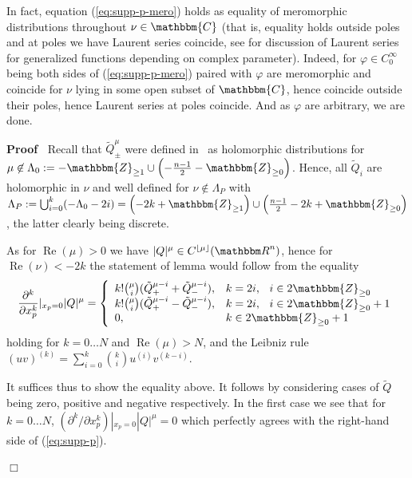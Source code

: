 \documentclass{article}
\newcommand{\assign}{:=}
\newcommand{\nin}{\not\in}
\newcommand{\tmop}[1]{\ensuremath{\operatorname{#1}}}
\newenvironment{proof}{\noindent\textbf{Proof\ }}{\hspace*{\fill}$\Box$\medskip}
\numberwithin{definition}{section}
\numberwithin{lemma}{section}
\numberwithin{proposition}{section}
{\theorembodyfont{\rmfamily}\newtheorem{remark}{Remark}
\numberwithin{remark}{section}
}
\newcommand{\C}{{\mathbbm{C}}}\newcommand{\Z}{{\mathbbm{Z}}}
\newcommand{\mybra}[1]{(#1)} \newcommand{\mysbra}[1]{\left[#1\right]}
\begin{document}
\begin{remark}
  In fact, equation (\ref{eq:supp-p-mero}) holds as equality of meromorphic
  distributions throughout $\nu \in \C$ (that is, equality holds outside poles
  and at poles we have Laurent series coincide, see {\cite[ch. I,
  A.2.3]{gelfand1980distribution}} for discussion of Laurent series for
  generalized functions depending on complex parameter). Indeed, for $\varphi
  \in C^{\infty}_0$ being both sides of (\ref{eq:supp-p-mero}) paired with
  $\varphi$ are meromorphic and coincide for $\nu$ lying in some open subset
  of $\C$, hence coincide outside their poles, hence Laurent series at poles
  coincide. And as $\varphi$ are arbitrary, we are done.
\end{remark}

\begin{proof}
  Recall that $\tilde{Q}^{\mu}_{\pm}$ were defined in
  {\cite{gelfand1980distribution}} \ as holomorphic distributions for $\mu
  \nin \Lambda_0 \assign - \Z_{\ge 1} \cup \left( - \frac{n - 1}{2} - \Z_{\ge
  0} \right)$. Hence, all $\tilde{Q}_i$ are holomorphic in $\nu$ and well
  defined for $\nu \nin \Lambda_P$ with $\Lambda_P \assign \bigcup_{i = 0}^k
  \mybra{- \Lambda_0 - 2 i} = \left( - 2 k + \Z_{\ge 1} \right) \cup \left(
  \frac{n - 1}{2} - 2 k + \Z_{\ge 0} \right)$, the latter clearly being
  discrete.
  
  As for $\tmop{Re} (\mu) > 0$ we have $| Q |^{\mu} \in C^{\lfloor \mu
  \rfloor} ( \R^n)$, hence for $\tmop{Re} (\nu) < - 2 k$ the statement of
  lemma would follow from the equality
  \begin{equation}
    \frac{\partial^k}{\partial x_p^k} |_{x_p = 0} | Q |^{\mu} = \left\{
    \begin{array}{ll}
      k! \binom{\mu}{i} \mybra{\tilde{Q}_+^{\mu - i} + \tilde{Q}_-^{\mu - i}},
      & k = 2 i, \hspace{0.75em} i \in 2 \Z_{\ge 0}\\
      k! \binom{\mu}{i} \mybra{\tilde{Q}_+^{\mu - i} - \tilde{Q}_-^{\mu - i}},
      & k = 2 i, \hspace{0.75em} i \in 2 \Z_{\ge 0} + 1\\
      0, & k \in 2 \Z_{\ge 0} + 1
    \end{array} \right. \label{eq:supp-p}
  \end{equation}
  holding for $k = 0 \ldots N$ and $\tmop{Re} (\mu) > N$, and the Leibniz rule
  $(uv)^{(k)} = \sum_{i = 0}^k \binom{k}{i} u^{(i)} v^{(k - i)}$.
  
  It suffices thus to show the equality above. It follows by considering cases
  of $\tilde{Q}$ being zero, positive and negative respectively. In the first
  case we see that for $k = 0 \ldots N$, $( \partial^k / \partial x_p^k)
  |_{x_p = 0} | Q |^{\mu} = 0$ which perfectly agrees with the right-hand side
  of (\ref{eq:supp-p}).
  

\end{proof}
\end{document}
